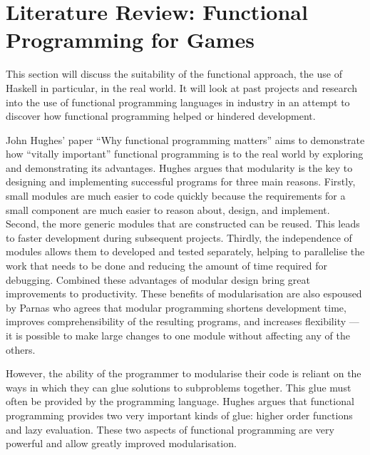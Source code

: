 \section{Literature Review: Functional Programming for Games}
\label{sec:fp_review}

\label{cf:code_organisation} %


This section will discuss the suitability of the functional approach, the use
of Haskell in particular, in the real world. It will look at past projects and
research into the use of functional programming languages in industry in an
attempt to discover how functional programming helped or hindered development.

John Hughes' paper ``Why functional programming matters'' aims to demonstrate how
``vitally important'' functional programming is to the real world by exploring and
demonstrating its advantages.\cite{hughes1989whyfp} Hughes argues that modularity
is the key to designing and implementing successful programs for three main reasons.
Firstly, small modules are much easier to code quickly because the requirements for
a small component are much easier to reason about, design, and implement. Second,
the more generic modules that are constructed can be reused. This leads to faster
development during subsequent projects. Thirdly, the independence of modules allows
them to developed and tested separately, helping to parallelise the work that needs
to be done and reducing the amount of time required for debugging. Combined these
advantages of modular design bring great improvements to productivity. These benefits
of modularisation are also espoused by Parnas who agrees that modular programming
shortens development time, improves comprehensibility of the resulting programs,
and increases flexibility --- it is possible to make large changes to one module
without affecting any of the others.\cite{parnas1972modular}

However, the ability of the programmer to modularise their code is reliant on the
ways in which they can glue solutions to subproblems together. This glue must
often be provided by the programming language. Hughes argues that functional
programming provides two very important kinds of glue: higher order functions
and lazy evaluation. These two aspects of functional programming are very powerful
and allow greatly improved modularisation.


